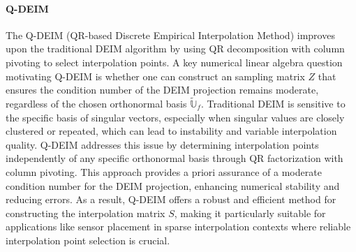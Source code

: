 \documentclass[11pt]{article}
\begin{document}
        \paragraph{Q-DEIM} The Q-DEIM (QR-based Discrete Empirical Interpolation Method) \cite{drmac2016new} improves upon the traditional DEIM algorithm by using QR decomposition with column pivoting to select interpolation points.
        A key numerical linear algebra question motivating Q-DEIM is whether one can construct an sampling matrix \( Z \) that ensures the condition number of the DEIM projection remains moderate, regardless of the chosen orthonormal basis \( \widetilde{\mathbb{U}}_f \).
        Traditional DEIM is sensitive to the specific basis of singular vectors, especially when singular values are closely clustered or repeated, which can lead to instability and variable interpolation quality.
        Q-DEIM addresses this issue by determining interpolation points independently of any specific orthonormal basis through QR factorization with column pivoting.
        This approach provides a priori assurance of a moderate condition number for the DEIM projection, enhancing numerical stability and reducing errors.
        As a result, Q-DEIM offers a robust and efficient method for constructing the interpolation matrix \( S \), making it particularly suitable for applications like sensor placement in sparse interpolation contexts where reliable interpolation point selection is crucial.
\end{document}
